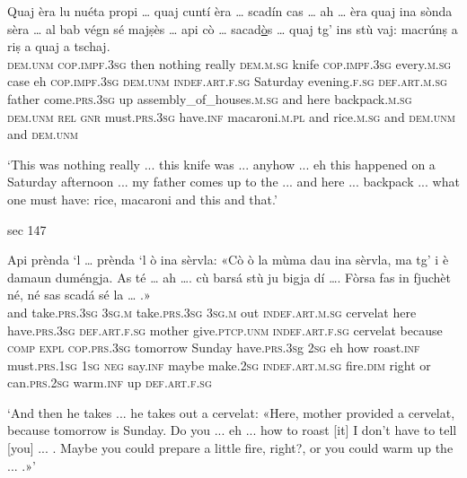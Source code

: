 \begin{linenumbers}
	\gll Quaj èra lu nuéta propi … quaj cuntí èra … scadín cas … ah … èra quaj ina sònda sèra … al bab végn sé majṣès … api cò … sacad\underline{ò}s … quaj tg’ ins stù vaj: macrúnṣ a riṣ a quaj a tschaj.   \\
	\textsc{dem.unm} \textsc{cop.impf.3sg} then nothing really {} \textsc{dem.m.sg} knife \textsc{cop.impf.3sg} {} every.\textsc{m.sg} case {} eh {} \textsc{cop.impf.3sg} \textsc{dem.unm} \textsc{indef.art.f.sg} Saturday evening.\textsc{f.sg} {} \textsc{def.art.m.sg} father come.\textsc{prs.3sg} up assembly\_of\_houses.\textsc{m.sg} {} and here {}  backpack.\textsc{m.sg} {} \textsc{dem.unm} \textsc{rel} \textsc{gnr} must.\textsc{prs.3sg} have.\textsc{inf} macaroni.\textsc{m.pl} and rice.\textsc{m.sg} and \textsc{dem.unm} and \textsc{dem.unm} \\
\end{linenumbers}
\medskip
\glt `This was nothing really ... this knife was ... anyhow ... eh this happened on a Saturday afternoon ... my father comes up to the ... and here ... backpack ... what one must have: rice, macaroni and this and that.'
\medskip

sec 147

\begin{linenumbers}
	\gll Api prènda ‘l … prènda ‘l ò ina sèrvla: «Cò ò la mùma dau ina sèrvla, ma tg’ i è damaun duméngja. As té … ah …. cù barsá stù ju bigja dí …. Fòrsa fas in fjuchèt né, né sas scadá sé la … .»\\
	and take.\textsc{prs.3sg} \textsc{3sg.m} {} take.\textsc{prs.3sg} \textsc{3sg.m} out \textsc{indef.art.m.sg} cervelat\footnotemark{} here have.\textsc{prs.3sg} \textsc{def.art.f.sg} mother give.\textsc{ptcp.unm} \textsc{indef.art.f.sg} cervelat because \textsc{comp} \textsc{expl} \textsc{cop.prs.3sg} tomorrow Sunday have.\textsc{prs.3s}g \textsc{2sg} {} eh {} how roast.\textsc{inf} must.\textsc{prs.1sg} \textsc{1sg} \textsc{neg} say.\textsc{inf} {} maybe make.\textsc{2sg} \textsc{indef.art.m.sg} fire.\textsc{dim} right or can.\textsc{prs.2sg} warm.\textsc{inf} up \textsc{def.art.f.sg}  \\
\end{linenumbers}
\medskip
\glt `And then he takes ... he takes out a cervelat: «Here, mother provided a cervelat, because tomorrow is Sunday. Do you ... eh ... how to roast [it] I don't have to tell [you] ... . Maybe you could prepare a little fire, right?, or you could warm up the ... .»'
\medskip

